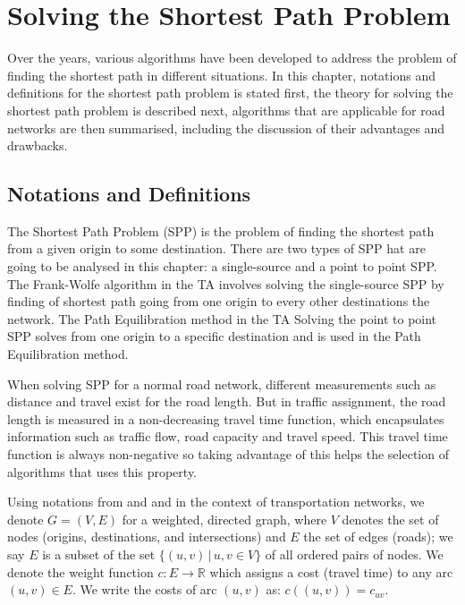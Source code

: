 \chapter{Solving the Shortest Path Problem}
\label{chap:solvingspp}

Over the years,
various algorithms have been developed 
to address the problem of finding the shortest path in different situations.
In this chapter,
notations and definitions for the shortest path problem is stated first, 
the theory for solving the shortest path problem is described next,
algorithms that are applicable for road networks are then summarised,
including the discussion of their advantages and drawbacks.

\section{Notations and Definitions}
The Shortest Path Problem (SPP) is the problem of finding the shortest path from a given origin  to some destination.
There are two types of SPP hat are going to
be analysed in this chapter:
a single-source and a point to point SPP.  
The Frank-Wolfe algorithm in the TA involves
solving the single-source SPP by finding of shortest path going from one origin to every other destinations the network.
The Path Equilibration method in the TA
Solving the point to point SPP solves from one origin to a specific destination and is used in the Path Equilibration method. 

When solving SPP for a normal road network,
different measurements such as distance and travel exist for the road length.
But in traffic assignment,
the road length is measured in a non-decreasing travel time function,
which encapsulates information such as traffic flow, road capacity and travel speed.
This travel time function is always non-negative so taking advantage of this helps the selection of algorithms that uses this property.

Using notations from \citet{Cormen} and \citet{Klunder} and in the context
of transportation networks,
we denote $ G = ( V, E ) $ for a weighted, directed graph,
where $ V $ denotes the set of nodes (origins, destinations, and intersections)
and $ E $ the set of edges (roads);
we say $ E $ is a subset of the set $ \{ (u, v)\, | \, u, v \in V \} $ of all ordered pairs of nodes.
We denote the weight function $ c : E \rightarrow \mathbb{R} $ which assigns a cost (travel time) to any arc $ (u,v) \in E $.
We write the costs of arc $(u, v)$ as: $ c((u, v)) = c_{uv} $.

